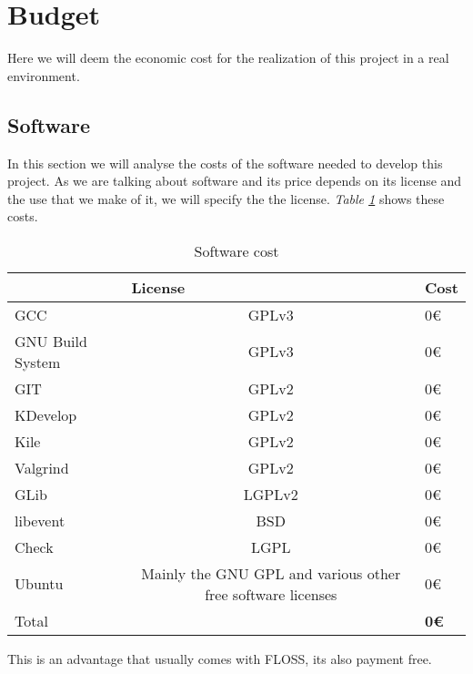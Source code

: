 \section{Budget}
Here we will deem the economic cost for the realization of this project in a real environment.
\subsection{Software}
In this section we will analyse the costs of the software needed to develop this project. As we are talking about software and its price
depends on its license and the use that we make of it, we will specify the the license. \emph{Table \ref{tab:soft}} shows these costs.
\begin{table}[h]
  \begin{center}
    \begin{tabular}{ l c | p{2.5cm} |}
      \cline{2-3}
      & \multicolumn{1}{|l|}{License} & Cost \\ \hline
      \multicolumn{1}{|l|}{GCC} & \multicolumn{1}{|c|}{GPLv3} & 0€\\ \hline
      \multicolumn{1}{|l|}{GNU Build System} & \multicolumn{1}{|c|}{GPLv3} & 0€  \\ \hline
      \multicolumn{1}{|l|}{GIT} & \multicolumn{1}{|c|}{GPLv2} & 0€ \\ \hline
      \multicolumn{1}{|l|}{KDevelop} & \multicolumn{1}{|c|}{GPLv2} & 0€ \\ \hline
      \multicolumn{1}{|l|}{Kile} & \multicolumn{1}{|c|}{GPLv2} & 0€ \\ \hline
      \multicolumn{1}{|l|}{Valgrind} & \multicolumn{1}{|c|}{GPLv2} & 0€ \\ \hline
      \multicolumn{1}{|l|}{GLib} & \multicolumn{1}{|c|}{LGPLv2} & 0€ \\ \hline
      \multicolumn{1}{|l|}{libevent} & \multicolumn{1}{|c|}{BSD} & 0€ \\ \hline
      \multicolumn{1}{|l|}{Check} & \multicolumn{1}{|c|}{LGPL} & 0€ \\ \hline
      \multicolumn{1}{|l|}{Ubuntu} & \multicolumn{1}{|p{2.5cm}|}{Mainly the GNU GPL and various other free software licenses} & 0€ \\
      \hline
      \hline
      \multicolumn{1}{|l}{ Total} & & {\bf 0€}\\
      \hline
    \end{tabular}
  \end{center}
  \caption{Software cost}
  \label{tab:soft}
\end{table}
This is an advantage that usually comes with FLOSS, its also payment free.
